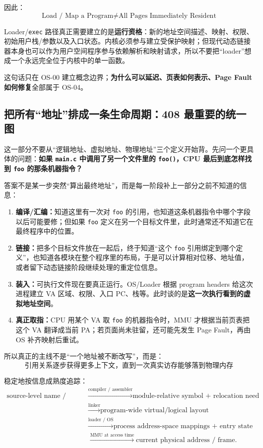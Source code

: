 \documentclass[11pt,a4paper]{ctexart}
\newcommand{\kw}[1]{\textbf{#1}}
\newcommand{\code}[1]{\texttt{#1}}
\begin{document}
因此：
\[
\boxed{\text{Load / Map a Program}\neq\text{All Pages Immediately Resident}}
\]

Loader/\code{exec} 路径真正需要建立的是\kw{运行资格}：新的地址空间描述、映射、权限、初始用户栈/参数以及入口状态。内核必须参与建立受保护映射；但现代动态链接器本身也可以作为用户空间程序参与依赖解析和映射请求，所以不要把“loader”想成一个永远完全位于内核中的单一函数。

这句话只在 OS-00 建立概念边界；\kw{为什么可以延迟、页表如何表示、Page Fault 如何修复}全部属于 OS-04。

\subsection{把所有“地址”排成一条生命周期：408 最重要的统一图}

这一部分不要从“逻辑地址、虚拟地址、物理地址”三个定义开始背。先问一个更具体的问题：\kw{如果 \code{main.c} 中调用了另一个文件里的 \code{foo()}，CPU 最后到底怎样找到 \code{foo} 的那条机器指令？}

答案不是某一步突然“算出最终地址”，而是每一阶段补上一部分之前不知道的信息：
\begin{enumerate}
  \item \kw{编译/汇编：}知道这里有一次对 \code{foo} 的引用，也知道这条机器指令中哪个字段以后可能要修；但如果 \code{foo} 定义在另一个目标文件里，此时通常还不知道它在最终程序中的位置。
  \item \kw{链接：}把多个目标文件放在一起后，终于知道“这个 \code{foo} 引用绑定到哪个定义”，也知道各模块在整个程序里的布局，于是可以计算相对位移、地址值，或者留下动态链接阶段继续处理的重定位信息。
  \item \kw{装入：}可执行文件现在要真正运行。OS/Loader 根据 program headers 给这次进程建立 VA 区域、权限、入口 PC、栈等。此时谈的是\textbf{这一次执行看到的虚拟地址空间}。
  \item \kw{真正取指：}CPU 用某个 VA 取 \code{foo} 的机器指令时，MMU 才根据当前页表把这个 VA 翻译成当前 PA；若页面尚未驻留，还可能先发生 Page Fault，再由 OS 补齐映射后重试。
\end{enumerate}

所以真正的主线不是“一个地址被不断改写”，而是：
\[
\boxed{\text{引用关系逐步获得更多上下文，直到一次真实访存能够落到物理内存}}
\]

稳定地按信息成熟度追踪：
\[
\boxed{
\begin{aligned}
\text{source-level name / object}
&\xrightarrow{\text{compiler / assembler}}
\text{module-relative symbol + relocation need}\\
&\xrightarrow{\text{linker}}
\text{program-wide virtual/logical layout}\\
&\xrightarrow{\text{loader / OS}}
\text{process address-space mappings + entry state}\\
&\xrightarrow{\text{MMU at access time}}
\text{current physical address / frame}.
\end{aligned}}
\]
\end{document}
